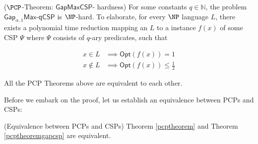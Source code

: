 \begin{theorem} \label{pcptheoremgapcsp}  ($\PCP$-Theorem: $\mathsf{GapMaxCSP}$- hardness) For some constants $q \in \mathbb{N}$, the problem $\mathsf{Gap}_{\alpha,1}\mathsf{Max}$-$\mathsf{qCSP}$ is $\NP$-hard. To elaborate, for every $\NP$ language $L$, there exists a polynomial time reduction mapping an $L$ to a instance $f(x)$ of some CSP $\Psi$ where $\Psi$ consists of $q$-ary predicates, such that

\begin{align*}
  x \in L & \implies \mathsf{Opt}(f(x)) = 1 \\
  x \not\in L & \implies \mathsf{Opt}(f(x)) \leq \frac{1}{2}
\end{align*}
\end{theorem}

\begin{theorem}
  All the PCP Theorems above are equivalent to each other.
\end{theorem}

Before we embark on the proof, let us establish an equivalence between PCPs and CSPs:

\begin{lemma} (Equivalence between PCPs and CSPs)
  Theorem \ref{pcptheorem} and  Theorem \ref{pcptheoremgapcsp} are equivalent.
\end{lemma}

